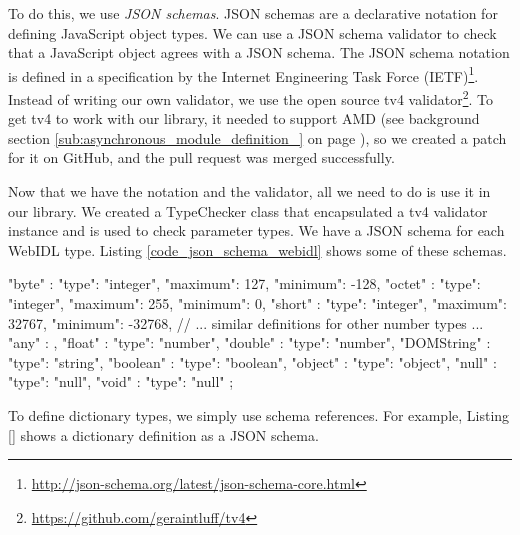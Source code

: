 To do this, we use \emph{JSON schemas}. JSON schemas are a declarative notation for defining JavaScript object types. We can use a JSON schema validator to check that a JavaScript object agrees with a JSON schema. The JSON schema notation is defined in a specification by the Internet Engineering Task Force (IETF)\footnote{\url{http://json-schema.org/latest/json-schema-core.html}}. Instead of writing our own validator, we use the open source tv4 validator\footnote{\url{https://github.com/geraintluff/tv4}}. To get tv4 to work with our library, it needed to support AMD (see background section \ref{sub:asynchronous_module_definition_} on page \pageref{sub:asynchronous_module_definition_}), so we created a patch for it on GitHub, and the pull request was merged successfully. 

Now that we have the notation and the validator, all we need to do is use it in our library. We created a TypeChecker class that encapsulated a tv4 validator instance and is used to check parameter types. We have a JSON schema for each WebIDL type. Listing \ref{code_json_schema_webidl} shows some of these schemas.

\begin{code}
{
  "byte"               : {"type": "integer", "maximum": 127, 
                                             "minimum": -128},
  "octet"              : {"type": "integer", "maximum": 255, 
                                             "minimum": 0},
  "short"              : {"type": "integer", "maximum": 32767, 
                                             "minimum": -32768},
  // ... similar definitions for other number types ...
  "any"                : {},
  "float"              : {"type": "number"},
  "double"             : {"type": "number"},
  "DOMString"          : {"type": "string"},
  "boolean"            : {"type": "boolean"},
  "object"             : {"type": "object"},
  "null"               : {"type": "null"},
  "void"               : {"type": "null"}
};
\end{code}

To define dictionary types, we simply use schema references. For example, Listing \ref{} shows a dictionary definition as a JSON schema.


